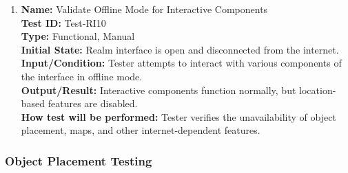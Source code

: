 \documentclass[12pt, titlepage]{article}
\begin{document}
\begin{enumerate}
  \item \textbf{Name:} Validate Offline Mode for Interactive Components \label{itm:Test-RI10} \\
        \textbf{Test ID:} Test-RI10 \\
        \textbf{Type:} Functional, Manual \\
        \textbf{Initial State:} Realm interface is open and disconnected from the internet. \\
        \textbf{Input/Condition:} Tester attempts to interact with various components of the interface in offline mode. \\
        \textbf{Output/Result:} Interactive components function normally, but location-based features are disabled. \\
        \textbf{How test will be performed:} Tester verifies the unavailability of object placement, maps, and other internet-dependent features.

\end{enumerate}

\subsubsection{Object Placement Testing}
\end{document}
